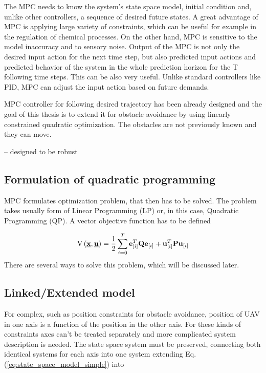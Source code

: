 \documentclass[a4paper,11pt,titlepage]{article}
\newcommand{\uvec}{\textbf{\underline{u}}}
\begin{document}
The MPC needs to know the system's state space model, initial condition and, unlike other controllers, a sequence of desired future states. A great advantage of MPC is applying large variety of constraints, which can be useful for example in the regulation of chemical processes. On the other hand, MPC is sensitive to the model inaccuracy and to sensory noise. Output of the MPC is not only the desired input action for the next time step, but also predicted input actions and predicted behavior of the system in the whole prediction horizon for the T following time steps. This can be also very useful. Unlike standard controllers like PID, MPC can adjust the input action based on future demands.

MPC controller for following desired trajectory has been already designed \cite{tomas} and the goal of this thesis is to extend it for obstacle avoidance by using linearly constrained quadratic optimization. The obstacles are not previously known and they can move. 

-- designed to be robust

\subsection{Formulation of quadratic programming}
MPC formulates optimization problem, that then has to be solved. The problem takes usually form of Linear Programming (LP) or, in this case, Quadratic Programming (QP). A vector objective function has to be defined

\begin{equation}
\label{eq:QP_formulation}
\begin{split}
\mathrm{V}\left(\textbf{\underline{x}}, \uvec\right) = \frac{1}{2}\sum_{i=0}^{T}\textbf{e}^T_{[i]}\textbf{Q}\textbf{e}_{[i]} + \textbf{u}^T_{[i]}\textbf{P}\textbf{u}_{[i]}
\end{split}
\end{equation}
There are several ways to solve this problem, which will be discussed later.

\subsection{{\color{red} Linked/Extended} model}		%
For complex, such as position constraints for obstacle avoidance, position of UAV in one axis is a function of the position in the other axis. For these kinds of constraints axes can't be treated separately and more complicated system description is needed. The state space system must be preserved, connecting both identical systems for each axis into one system extending Eq. (\ref{eq:state_space_model_simple}) into 
\end{document}
